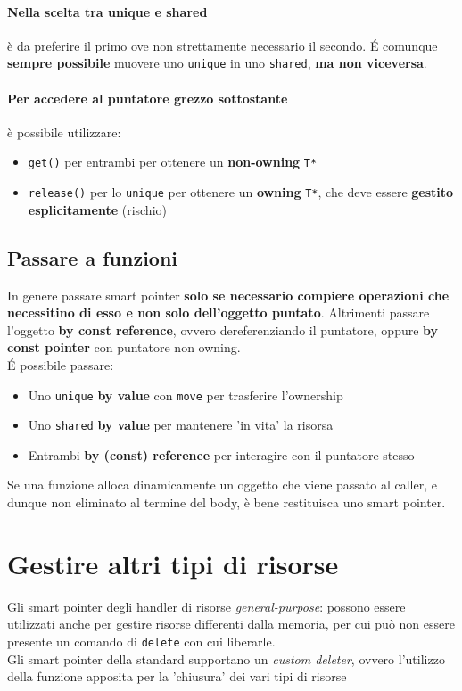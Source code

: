 \documentclass[10pt, oneside]{book}
\begin{document}
\paragraph{Nella scelta tra unique e shared} è da preferire il primo ove non strettamente necessario il secondo. \'E comunque \textbf{sempre possibile} muovere uno \texttt{unique} in uno \texttt{shared}, \textbf{ma non viceversa}.

\paragraph{Per accedere al puntatore grezzo sottostante} è possibile utilizzare:
\begin{itemize}
\item \texttt{get()} per entrambi per ottenere un \textbf{non-owning} \texttt{T*}
\item \texttt{release()} per lo \texttt{unique} per ottenere un \textbf{owning} \texttt{T*}, che deve essere \textbf{gestito esplicitamente} (rischio)
\end{itemize}

\subsection{Passare a funzioni}
In genere passare smart pointer \textbf{solo se necessario compiere operazioni che necessitino di esso e non solo dell'oggetto puntato}. Altrimenti passare l'oggetto \textbf{by const reference}, ovvero dereferenziando il puntatore, oppure \textbf{by const pointer} con puntatore non owning.\\
\'E possibile passare:
\begin{itemize}
\item Uno \texttt{unique} \textbf{by value} con \texttt{move} per trasferire l'ownership
\item Uno \texttt{shared} \textbf{by value} per mantenere 'in vita' la risorsa
\item Entrambi \textbf{by (const) reference} per interagire con il puntatore stesso
\end{itemize}
Se una funzione alloca dinamicamente un oggetto che viene passato al caller, e dunque non eliminato al termine del body, è bene restituisca uno smart pointer.

\section{Gestire altri tipi di risorse}
Gli smart pointer degli handler di risorse \textit{general-purpose}: possono essere utilizzati anche per gestire risorse differenti dalla memoria, per cui può non essere presente un comando di \texttt{delete} con cui liberarle.\\
Gli smart pointer della standard supportano un \textit{custom deleter}, ovvero l'utilizzo della funzione apposita per la 'chiusura' dei vari tipi di risorse
\end{document}
